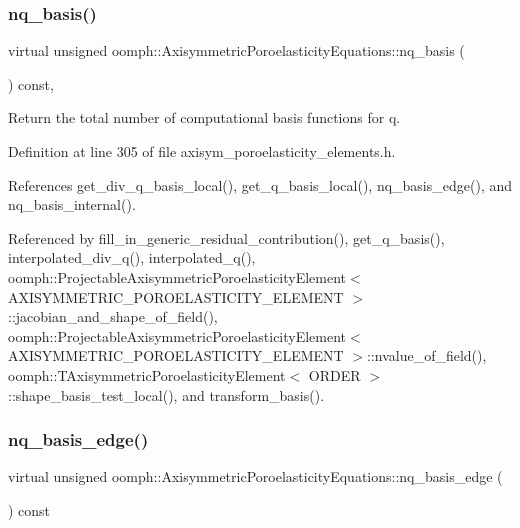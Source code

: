 \subsubsection{\texorpdfstring{nq\+\_\+basis()}{nq\_basis()}}
{\footnotesize\ttfamily virtual unsigned oomph\+::\+Axisymmetric\+Poroelasticity\+Equations\+::nq\+\_\+basis (\begin{DoxyParamCaption}{ }\end{DoxyParamCaption}) const\hspace{0.3cm}{\ttfamily [inline]}, {\ttfamily [virtual]}}



Return the total number of computational basis functions for q. 



Definition at line 305 of file axisym\+\_\+poroelasticity\+\_\+elements.\+h.



References get\+\_\+div\+\_\+q\+\_\+basis\+\_\+local(), get\+\_\+q\+\_\+basis\+\_\+local(), nq\+\_\+basis\+\_\+edge(), and nq\+\_\+basis\+\_\+internal().



Referenced by fill\+\_\+in\+\_\+generic\+\_\+residual\+\_\+contribution(), get\+\_\+q\+\_\+basis(), interpolated\+\_\+div\+\_\+q(), interpolated\+\_\+q(), oomph\+::\+Projectable\+Axisymmetric\+Poroelasticity\+Element$<$ A\+X\+I\+S\+Y\+M\+M\+E\+T\+R\+I\+C\+\_\+\+P\+O\+R\+O\+E\+L\+A\+S\+T\+I\+C\+I\+T\+Y\+\_\+\+E\+L\+E\+M\+E\+N\+T $>$\+::jacobian\+\_\+and\+\_\+shape\+\_\+of\+\_\+field(), oomph\+::\+Projectable\+Axisymmetric\+Poroelasticity\+Element$<$ A\+X\+I\+S\+Y\+M\+M\+E\+T\+R\+I\+C\+\_\+\+P\+O\+R\+O\+E\+L\+A\+S\+T\+I\+C\+I\+T\+Y\+\_\+\+E\+L\+E\+M\+E\+N\+T $>$\+::nvalue\+\_\+of\+\_\+field(), oomph\+::\+T\+Axisymmetric\+Poroelasticity\+Element$<$ O\+R\+D\+E\+R $>$\+::shape\+\_\+basis\+\_\+test\+\_\+local(), and transform\+\_\+basis().

\mbox{\label{classoomph_1_1AxisymmetricPoroelasticityEquations_aa5141d30c6dc0d4209ae043ddcea3d2e}} 
\subsubsection{\texorpdfstring{nq\+\_\+basis\+\_\+edge()}{nq\_basis\_edge()}}
{\footnotesize\ttfamily virtual unsigned oomph\+::\+Axisymmetric\+Poroelasticity\+Equations\+::nq\+\_\+basis\+\_\+edge (\begin{DoxyParamCaption}{ }\end{DoxyParamCaption}) const\hspace{0.3cm}{\ttfamily [pure virtual]}}



